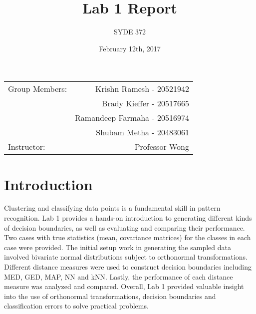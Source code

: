 \documentclass{article}
\title{Lab 1 Report} %
\author{SYDE 372} %
\date{February 12th, 2017} %
\begin{document}
\maketitle

\begin{center}
\begin{tabular}{l r}
Group Members: & Krishn Ramesh - 20521942 \\ %
& Brady Kieffer - 20517665 \\
& Ramandeep Farmaha - 20516974 \\
& Shubam Metha - 20483061\\
Instructor: & Professor Wong %
\end{tabular}
\end{center}



\section{Introduction}

Clustering and classifying data points is a fundamental skill in pattern recognition. Lab 1 provides a hands-on introduction to generating different kinds of decision boundaries, as well as evaluating and comparing their performance. Two cases with true statistics (mean, covariance matrices) for the classes in each case were provided. The initial setup work in generating the sampled data involved bivariate normal distributions subject to orthonormal transformations. Different distance measures were used to construct decision boundaries including MED, GED, MAP, NN and kNN. Lastly, the performance of each distance measure was analyzed and compared. Overall, Lab 1 provided valuable insight into the use of orthonormal transformations, decision boundaries and classification errors to solve practical problems.
\end{document}
